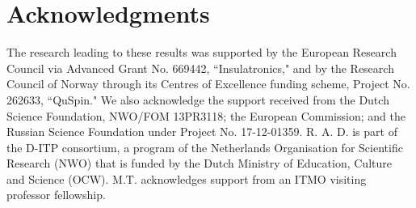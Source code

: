 \documentclass[aps,prl,twocolumn,amsmath,amssymb,superscriptaddress]{revtex4}%
\begin{document}
\section*{Acknowledgments}
The research leading to these results was supported by the European Research Council via Advanced Grant No. 669442, ``Insulatronics," and by the Research Council of Norway through its Centres of Excellence funding scheme, Project No. 262633, ``QuSpin." We also acknowledge the support received from the Dutch Science Foundation, NWO/FOM 13PR3118; the European Commission; and the Russian Science Foundation under Project No. 17-12-01359. R. A. D. is part of the D-ITP consortium, a program of the Netherlands Organisation for Scientific Research (NWO) that is funded by the Dutch Ministry of Education, Culture and Science (OCW). M.T. acknowledges support from an ITMO visiting professor fellowship.
\end{document}
